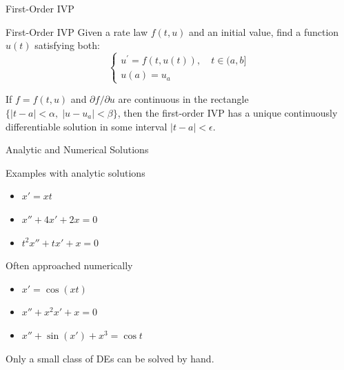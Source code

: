 \documentclass[10pt]{beamer}
\begin{document}
\begin{frame}{First-Order IVP}
    \begin{block}{First-Order IVP}
        Given a rate law $f(t,u)$ and an initial value, find a function $u(t)$ satisfying both: 
        $$
        \begin{cases}
		u^\prime = f(t,u(t)), \quad t \in (a,b]\\
		u(a) = u_a
	\end{cases}
        $$
    \end{block}

    \begin{theorem}
        If $f = f(t,u)$ and $\partial f/\partial u$ are continuous in the rectangle $\{ |t-a|<\alpha , \; |u-u_a|<\beta  \}$, then the first-order IVP has a unique continuously differentiable solution in some interval $|t-a| < \epsilon$.  
    \end{theorem}

\end{frame}




\begin{frame}{Analytic and Numerical Solutions}
\begin{block}{Examples with analytic solutions}
\begin{itemize}
    \item $x' = xt$
    \item $x''+4x'+2x=0$
    \item $t^2x'' + tx'+x=0 $
\end{itemize}
\end{block}

\begin{block}{Often approached numerically}
\begin{itemize}
    \item $x'=\cos(xt)$
    \item $x'' + x^2x' +x=0 $
    \item $x'' + \sin(x') +x^3=\cos t$
\end{itemize}
\end{block}
\begin{center}
    Only a small class of DEs can be solved by hand.
\end{center}
\end{frame}

\end{document}
